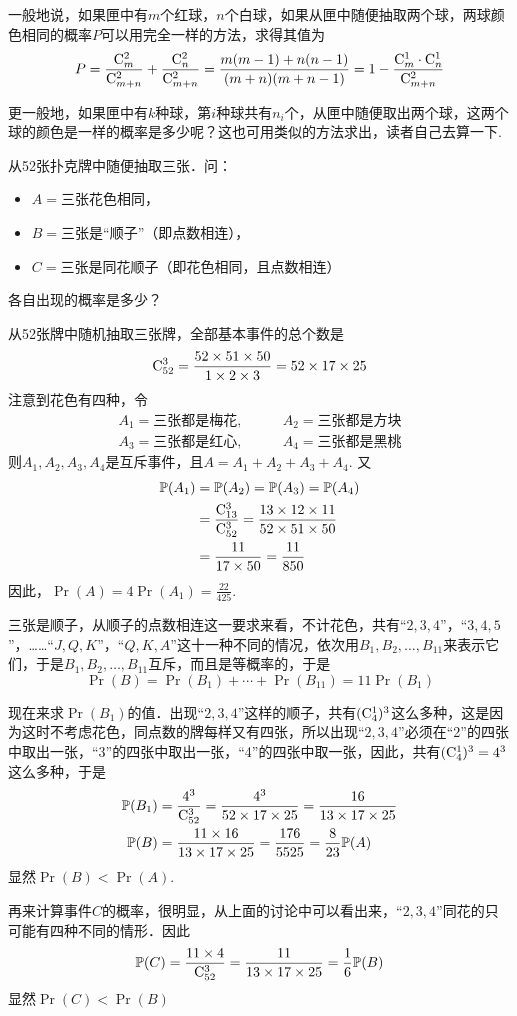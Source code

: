 一般地说，如果匣中有$m$个红球，$n$个白球，如果从匣中随便抽取两个球，两球颜色相同的概率$P$可以用完全一样的方法，求得其值为
\[P=\dfrac{{\rm C}^{2}_{m}}{{\rm C}^{2}_{m+n}}+\dfrac{{\rm C}^{2}_{n}}{{\rm C}^{2}_{m+n}}=\dfrac{m(m-1)+n(n-1)}{(m+n)(m+n-1)}=1-\dfrac{{\rm C}^{1}_{m}\cdot {\rm C}^{1}_{n}}{{\rm C}^{2}_{m+n}}\]

更一般地，如果匣中有$k$种球，第$i$种球共有$n_i$个，从匣中随便取出两个球，这两个球的颜色是一样的概率是多少呢？这也可用类似的方法求出，读者自己去算一下.

\begin{example}
    从52张扑克牌中随便抽取三张．问：
\begin{itemize}
\item $A=$三张花色相同，
\item $B=$三张是“顺子”（即点数相连），
\item $C=$三张是同花顺子（即花色相同，且点数相连）
\end{itemize}
各自出现的概率是多少？
\end{example}

\begin{solution}
从52张牌中随机抽取三张牌，全部基本事件的总个数是
\[{\rm C}^{3}_{52}=\dfrac{52\times 51\times 50}{1\times 2\times 3}=52\times 17\times 25\]
注意到花色有四种，令
\[\begin{split}
    A_1=\text{三张都是梅花},&\qquad 
A_2=\text{三张都是方块}\\
A_3=\text{三张都是红心},&\qquad 
A_4=\text{三张都是黑桃}
\end{split}\]
则$A_1,A_2,A_3,A_4$是互斥事件，且$A=A_1+A_2+A_3+A_4$. 又
\[\begin{split}
    \mathbb{P}(A_1)&=\mathbb{P}(A_2)=\mathbb{P}(A_3)=\mathbb{P}(A_4)\\
    &=\dfrac{{\rm C}^{3}_{13}}{{\rm C}^{3}_{52}}=\dfrac{13\times 12\times 11}{52\times 51\times 50}\\
    &=\dfrac{11}{17\times 50}=\dfrac{11}{850}
\end{split} \]
因此，$\Pr(A)=4\Pr(A_1)=\frac{22}{425}$.

三张是顺子，从顺子的点数相连这一要求来看，不计花色，共有“$2,3,4$”，“$3,4,5$”，……“$J,Q,K$”，“$Q,K,A$”这十一种不同的情况，依次用$B_1,B_2,\ldots,B_{11}$来表示它们，于是$B_1,B_2,\ldots,B_{11}$互斥，而且是等概率的，于是
\[\Pr(B)=\Pr(B_1)+\cdots +\Pr(B_{11})=11\Pr(B_1)\]

现在来求$\Pr(B_1)$的值．出现“$2,3,4$”这样的顺子，共有$({\rm C}^{1}_{4})^3$这么多种，这是因为这时不考虑花色，同点数的牌每样又有四张，所以出现“$2,3,4$”必须在“2”的四张中取出一张，“3”的四张中取出一张，“4”的四张中取一张，因此，共有$({\rm C}^{1}_{4})^3=4^3$这么多种，于是
\[\begin{split}
    \mathbb{P}(B_1)&=\dfrac{4^3}{{\rm C}^{3}_{52}}=\dfrac{4^3}{52\times 17\times 25}=\dfrac{16}{13\times 17\times 25}\\
    \mathbb{P}(B)&=\dfrac{11\times 16}{13\times 17\times 25}=\dfrac{176}{5525}=\dfrac{8}{23}\mathbb{P}(A)
\end{split}\]
显然$\Pr(B)<\Pr(A)$.

再来计算事件$C$的概率，很明显，从上面的讨论中可以看出来，“$2,3,4$”同花的只可能有四种不同的情形．因此
\[\mathbb{P}(C)=\dfrac{11\times 4}{{\rm C}^{3}_{52}}=\dfrac{11}{13\times17\times25} =\dfrac{1}{6}\mathbb{P}(B)\]
显然$\Pr(C)<\Pr(B)$

\end{solution}

